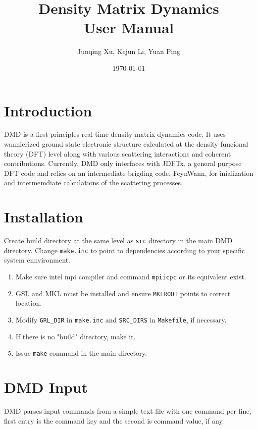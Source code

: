 \documentclass{article}
\title{Density Matrix Dynamics \\
User Manual}
\author{Junqing Xu, Kejun Li, Yuan Ping}
\date{\today}
\begin{document}
	
	\maketitle
	\pagebreak
	\tableofcontents
	
	\pagebreak
	
\section{Introduction}
DMD is a first-principles real time density matrix dynamics code. It uses wannierized ground state electronic structure calculated at the density funcional theory (DFT) level along with various scattering interactions and coherent contributions. Currently, DMD only interfaces with JDFTx, a general purpose DFT code and relies on an intermediate brigding code, FeynWann, for inialization and intermemdiate calculations of the scattering processes. 

\section{Installation}

Create build directory at the same level as \verb|src| directory in the main DMD directory. Change  \verb|make.inc| to point to dependencies according to your specific system ennvironment.
\begin{enumerate}
\item Make sure intel mpi compiler and command \verb|mpiicpc| or its equivalent exist.
\item  GSL and MKL must be installed and ensure \verb|MKLROOT|  points to correct location.
\item Modify \verb|GRL_DIR| in \verb|make.inc| and \verb|SRC_DIRS| in \verb|Makefile|, if necessary.
\item If there is no "build" directory, make it.
\item Issue \verb|make| command in the main directory. 
\end{enumerate}

	
\section{DMD Input}%
DMD parses input commands from a simple text file with one command per line, first entry is the command key and the second is command value, if any. 
\end{document}
